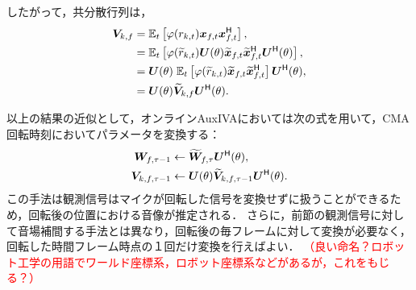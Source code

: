 \documentclass[sip,biber]{now-journal}
\newcommand{\todo}[1]{\textcolor{red}{#1}}
\begin{document}
したがって，共分散行列は，
\begin{align}
  \cov _{\src,\freq} &= \expct  _{\tframe} \left[\weight (\var _{\src,\tframe}) \Obs _{\ft} \Obs _{\ft} ^{\hermite}\right], \\
                     &= \expct  _{\tframe} \left[\weight (\refpos{\var} _{\src,\tframe}) \rotMat (\rotSpat) \refpos{\Obs} _{\ft} \refpos{\Obs} _{\ft} ^{\hermite} \rotMat ^{\hermite} (\rotSpat)\right], \\
                     &= \rotMat (\rotSpat)\; \expct  _{\tframe} \left[\weight (\refpos{\var} _{\src,\tframe}) \refpos{\Obs} _{\ft} \refpos{\Obs} _{\ft} ^{\hermite} \right] \rotMat ^{\hermite} (\rotSpat), \\
                     &= \rotMat (\rotSpat) \refpos{\cov} _{\src,\freq} \rotMat ^{\hermite} (\rotSpat).
\end{align}

以上の結果の近似として，オンラインAuxIVAにおいては次の式を用いて，CMA回転時刻においてパラメータを変換する：
\begin{align}
  \bm{W} _{f,\tau - 1} &\gets \widetilde{\bm{W}} _{f,\tau} \bm{U} ^{\mathsf{H}} (\theta), \\
  \bm{V} _{k,f,\tau - 1} &\gets \bm{U} (\theta) \widetilde{\bm{V}} _{k,f,\tau - 1} \bm{U} ^{\mathsf{H}} (\theta).
\end{align}
この手法は観測信号はマイクが回転した信号を変換せずに扱うことができるため，回転後の位置における音像が推定される．
さらに，前節の観測信号に対して音場補間する手法とは異なり，回転後の毎フレームに対して変換が必要なく，回転した時間フレーム時点の１回だけ変換を行えばよい．
\todo{%
  （良い命名？ロボット工学の用語でワールド座標系，ロボット座標系などがあるが，これをもじる？）
}
\end{document}
